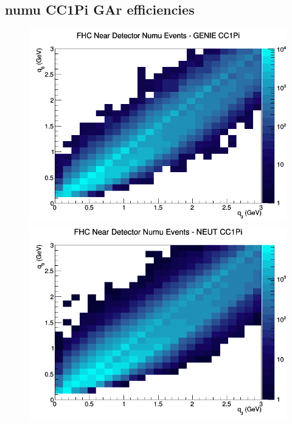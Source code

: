 \subsection{numu CC1Pi GAr efficiencies}
\begin{figure}[h]
\includegraphics[width=\linewidth]{eff_q0_q3/GAr/CC1Pi_FHC_ND_numu_q3_q0_GENIE.png}
\endminipage
{}
\includegraphics[width=\linewidth]{eff_q0_q3/GAr/CC1Pi_FHC_ND_numu_q3_q0_NEUT.png}
\endminipage
{}

\end{figure}
